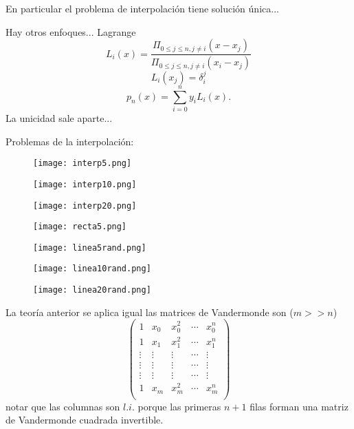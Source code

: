  En particular el problema de interpolación tiene solución única...

Hay otros enfoques... Lagrange
$$
L_i(x)=\frac{\Pi_{0\le j\le n, j\neq i}(x-x_j)}{\Pi_{0\le j\le n, j\neq i}(x_i-x_j)}
$$
 $$
 L_i(x_j)=\delta_i^j
 $$
 $$
 p_n(x)=\sum_{i=0}^ny_iL_i(x).
 $$
 La unicidad sale aparte...

 Problemas de la interpolación:
 
 \begin{figure}
\centering\texttt{[image: interp5.png]}
\end{figure}


\begin{figure}
\centering\texttt{[image: interp10.png]}
\end{figure}

\begin{figure}
\centering\texttt{[image: interp20.png]}
\end{figure}


 \begin{figure}
\centering\texttt{[image: recta5.png]}
\end{figure}

 
 \begin{figure}
\centering\texttt{[image: linea5rand.png]}
\end{figure}

\begin{figure}
\centering\texttt{[image: linea10rand.png]}
\end{figure}

\begin{figure}
\centering\texttt{[image: linea20rand.png]}
\end{figure}

La teoría anterior se aplica igual las matrices de Vandermonde son ($m>>n$)
 $$
 \begin{pmatrix}
 1&x_{0}&x_{0}^{2}&\cdots &x_{0}^{n}\\
 1&x_{1}&x_{1}^{2}&\cdots &x_{1}^{n}\\
 \vdots&\vdots&\vdots&\cdots&\vdots\\
 \vdots&\vdots&\vdots&\cdots&\vdots\\
  \vdots&\vdots&\vdots&\cdots&\vdots\\
 1&x_{m}&x_{m}^{2}&\cdots &x_{m}^{n}\\
 \end{pmatrix}
$$
notar que las columnas son $l.i.$ porque las primeras $n+1$ filas forman una matriz de Vandermonde 
cuadrada invertible.

